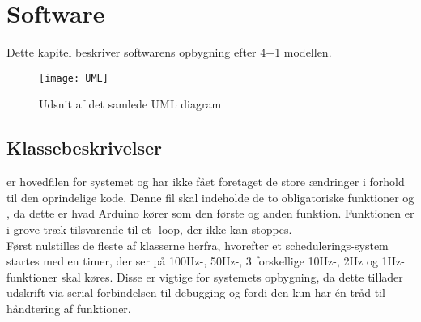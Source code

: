 \documentclass[Main]{subfiles}
\begin{document}
\chapter{Software}
Dette kapitel beskriver softwarens opbygning efter 4+1 modellen. 

\begin{figure}[H]
\centering
\texttt{[image: UML]}
\caption{Udsnit af det samlede UML diagram}
\end{figure}


\section{Klassebeskrivelser}

 er hovedfilen for systemet og har ikke fået foretaget de store ændringer i forhold til den oprindelige kode.
Denne fil skal indeholde de to obligatoriske funktioner  og , da dette er hvad Arduino kører som den første og anden funktion.
Funktionen  er i grove træk tilsvarende til et -loop, der ikke kan stoppes.
\\
Først nulstilles de fleste af klasserne herfra, hvorefter et schedulerings-system startes med en timer, der ser på 100Hz-, 50Hz-, 3 forskellige 10Hz-, 2Hz og 1Hz-funktioner skal køres. 
Disse er vigtige for systemets opbygning, da dette tillader udskrift via serial-forbindelsen til debugging og fordi den kun har én tråd til håndtering af funktioner.

\begin{Function}
\end{Function}


\begin{Function}
\end{Function}


\begin{Function}
\end{Function}
\end{document}
